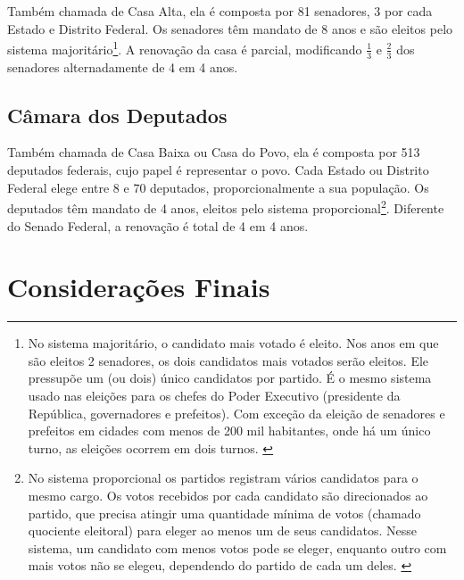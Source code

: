 \documentclass[a4paper,titlepage]{ppgi}\usepackage[]{graphicx}\usepackage[]{color}
\makeatletter
\newenvironment{kframe}{%
 \def\at@end@of@kframe{}%
 \ifinner\ifhmode%
  \def\at@end@of@kframe{\end{minipage}}%
  \begin{minipage}{\columnwidth}%
 \fi\fi%
 \def\FrameCommand##1{\hskip\@totalleftmargin \hskip-\fboxsep
 \colorbox{shadecolor}{##1}\hskip-\fboxsep
     \hskip-\linewidth \hskip-\@totalleftmargin \hskip\columnwidth}%
 \MakeFramed {\advance\hsize-\width
   \@totalleftmargin\z@ \linewidth\hsize
   \@setminipage}}%
 {\par\unskip\endMakeFramed%
 \at@end@of@kframe}
\newenvironment{knitrout}{}{} %
\makeatother
\begin{document}
Também chamada de Casa Alta, ela é composta por 81 senadores, 3 por cada Estado e Distrito Federal. Os senadores têm mandato de 8 anos e são eleitos pelo sistema majoritário\footnote{No sistema majoritário, o candidato mais votado é eleito. Nos anos em que são eleitos 2 senadores, os dois candidatos mais votados serão eleitos. Ele pressupõe um (ou dois) único candidatos por partido. É o mesmo sistema usado nas eleições para os chefes do Poder Executivo (presidente da República, governadores e prefeitos). Com exceção da eleição de senadores e prefeitos em cidades com menos de 200 mil habitantes, onde há um único turno, as eleições ocorrem em dois turnos. \cite{Carneiro2013}}. A renovação da casa é parcial, modificando $\frac{1}{3}$ e $\frac{2}{3}$ dos senadores alternadamente de 4 em 4 anos.

\subsection{Câmara dos Deputados}

Também chamada de Casa Baixa ou Casa do Povo, ela é composta por 513 deputados federais, cujo papel é representar o povo. Cada Estado ou Distrito Federal elege entre 8 e 70 deputados, proporcionalmente a sua população. Os deputados têm mandato de 4 anos, eleitos pelo sistema proporcional\footnote{No sistema proporcional os partidos registram vários candidatos para o mesmo cargo. Os votos recebidos por cada candidato são direcionados ao partido, que precisa atingir uma quantidade mínima de votos (chamado quociente eleitoral) para eleger ao menos um de seus candidatos. Nesse sistema, um candidato com menos votos pode se eleger, enquanto outro com mais votos não se elegeu, dependendo do partido de cada um deles. \cite{Carneiro2013,Bramatti2014}}. Diferente do Senado Federal, a renovação é total de 4 em 4 anos.

\section{Considerações Finais}


\begin{knitrout}
\color{fgcolor}\begin{kframe}


{\ttfamily\noindent\bfseries\color{errorcolor}{\#\# Error in `[<-.data.frame`(`*tmp*`, data[, column] == "{}"{}, column, value = NA): missing values are not allowed in subscripted assignments of data frames}}\end{kframe}
\end{knitrout}
\end{document}
